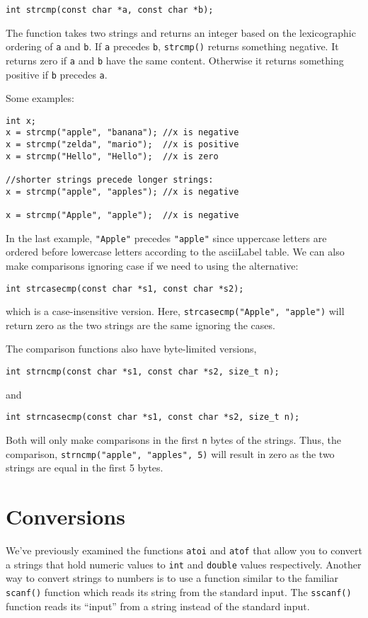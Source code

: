 \texttt{int strcmp(const char *a, const char *b);}

The function takes two strings and returns an integer based
on the lexicographic ordering of \texttt{a} and
\texttt{b}.  If \texttt{a} precedes \texttt{b}, 
\texttt{strcmp()} returns something negative.  It
returns zero if \texttt{a} and \texttt{b} 
have the same content.  Otherwise it returns something
positive if \texttt{b} precedes \texttt{a}.

Some examples:

\begin{verbatim}
int x;
x = strcmp("apple", "banana"); //x is negative
x = strcmp("zelda", "mario");  //x is positive
x = strcmp("Hello", "Hello");  //x is zero

//shorter strings precede longer strings:
x = strcmp("apple", "apples"); //x is negative

x = strcmp("Apple", "apple");  //x is negative
\end{verbatim}

In the last example, \texttt{"Apple"} precedes
\texttt{"apple"} since uppercase letters are
ordered before lowercase letters according to the
\gls{asciiLabel} table.  We can also make comparisons
ignoring case if we need to using the alternative:

\texttt{int strcasecmp(const char *s1, const char *s2);}

which is a case-insensitive version.  Here, 
\texttt{strcasecmp("Apple", "apple")} will return 
zero as the two strings are the same ignoring the cases.

The comparison functions also have byte-limited versions, 

\texttt{int strncmp(const char *s1, const char *s2, size_t n);}

and

\texttt{int strncasecmp(const char *s1, const char *s2, size_t n);}

Both will only make comparisons in the first \texttt{n}
bytes of the strings.  Thus, the comparison, 
\texttt{strncmp("apple", "apples", 5)} will result in zero as 
the two strings are equal in the first 5 bytes.

\section{Conversions}

We've previously examined the functions \texttt{atoi} 
and \texttt{atof} that allow you to convert a strings
that hold numeric values to \texttt{int} and 
\texttt{double} values respectively.  Another way to
convert strings to numbers is to use a function similar to
the familiar \texttt{scanf()} function which reads
its string from the standard input.  The \texttt{sscanf()}
function reads its ``input'' from a string instead of the
standard input.

